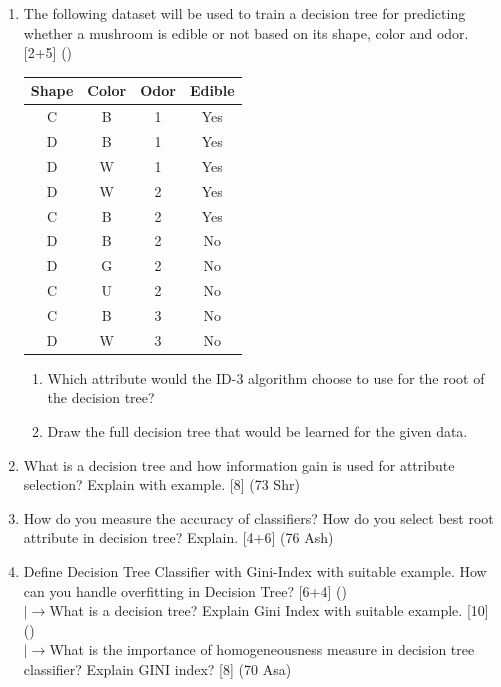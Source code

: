 \documentclass[12pt]{article}
\newcommand{\lb}{\\$\left|\rightarrow\right.$}
\begin{document}
\begin{enumerate}[topsep=0pt, noitemsep]
      \item The following dataset will be used to train a decision tree for predicting whether a mushroom is edible or not based on its shape, color and odor. \hfill [2+5] ()\\
        \small
        \begin{tabular}{|c|c|c|c|}
          \hline
          Shape & Color & Odor & Edible \\ \hline
          C & B & 1 & Yes \\ \hline
          D & B & 1 & Yes \\ \hline
          D & W & 1 & Yes \\ \hline
          D & W & 2 & Yes \\ \hline
          C & B & 2 & Yes \\ \hline
          D & B & 2 & No \\ \hline
          D & G & 2 & No \\ \hline
          C & U & 2 & No \\ \hline
          C & B & 3 & No \\ \hline
          D & W & 3 & No \\ \hline
        \end{tabular}
        \normalsize
        \begin{enumerate}[label=(\alph*),topsep=2pt,noitemsep]
          \item Which attribute would the ID-3 algorithm choose to use for the root of the decision tree?
          \item Draw the full decision tree that would be learned for the given data.
        \end{enumerate}

      \item What is a decision tree and how information gain is used for attribute selection? Explain with example. \hfill [8] (73 Shr)

      \item How do you measure the accuracy of classifiers? How do you select best root attribute in decision tree? Explain. \hfill [4+6] (76 Ash)

      \item Define Decision Tree Classifier with Gini-Index with suitable example. How can you handle overfitting in Decision Tree? \hfill [6+4] ()
        \lb What is a decision tree? Explain Gini Index with suitable example. \hfill [10] ()
        \lb What is the importance of homogeneousness measure in decision tree classifier? Explain GINI index? \hfill [8] (70 Asa)


\end{enumerate}
\end{document}
